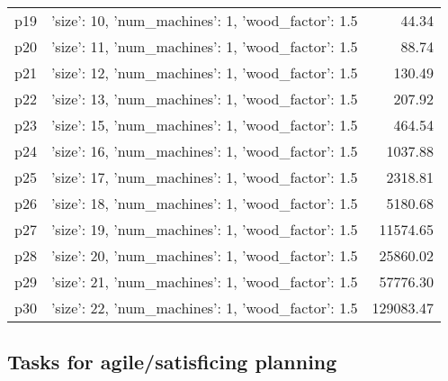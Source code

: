\documentclass{article}
\begin{document}
\begin{center}
\begin{tabular}{@{}l|r|r@{}}
  p19&{'size': 10, 'num\_machines': 1, 'wood\_factor': 1.5}&44.34\\
  p20&{'size': 11, 'num\_machines': 1, 'wood\_factor': 1.5}&88.74\\
  p21&{'size': 12, 'num\_machines': 1, 'wood\_factor': 1.5}&130.49\\
  p22&{'size': 13, 'num\_machines': 1, 'wood\_factor': 1.5}&207.92\\
  p23&{'size': 15, 'num\_machines': 1, 'wood\_factor': 1.5}&464.54\\
  p24&{'size': 16, 'num\_machines': 1, 'wood\_factor': 1.5}&1037.88\\
  p25&{'size': 17, 'num\_machines': 1, 'wood\_factor': 1.5}&2318.81\\
  p26&{'size': 18, 'num\_machines': 1, 'wood\_factor': 1.5}&5180.68\\
  p27&{'size': 19, 'num\_machines': 1, 'wood\_factor': 1.5}&11574.65\\
  p28&{'size': 20, 'num\_machines': 1, 'wood\_factor': 1.5}&25860.02\\
  p29&{'size': 21, 'num\_machines': 1, 'wood\_factor': 1.5}&57776.30\\
  p30&{'size': 22, 'num\_machines': 1, 'wood\_factor': 1.5}&129083.47
                            \end{tabular}
                            \end{center}
                    

                                \subsection*{Tasks for agile/satisficing planning}
                                
\end{document}
